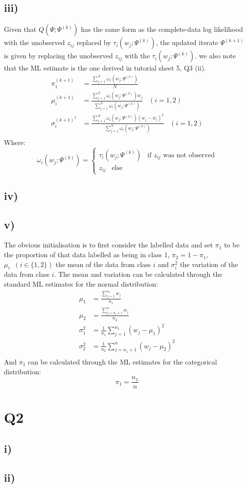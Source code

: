 \documentclass{article}
\begin{document}
\subsection*{iii)}
Given that $Q(\Psi;\Psi^{(k)})$ has the same form as the complete-data log likelihood with the unobserved $z_{ij}$ replaced by $\tau_i(w_j;\Psi^{(k)})$, the updated iterate $\Psi^{(k+1)}$ is given by replacing the unobserved $z_{ij}$ with the $\tau_i(w_j;\Psi^{(k)})$. we also note that the ML estimate is the one derived in tutorial sheet 5, Q3 (ii).
\begin{align*}
\pi_1^{(k+1)}&=\frac{\sum_{j=1}^{N}\omega_1(w_j;\Psi^{(k)})}{N}\\
\mu_i^{(k+1)}&=\frac{\sum_{j=1}^{N}\omega_i(w_j;\Psi^{(k)})w_j}{\sum_{j=1}^{N}\omega_i(w_j;\Psi^{(k)})}\;\;\;(i=1,2)\\
\sigma_i^{(k+1)^2}&=\frac{\sum_{j=1}^{N}\omega_i(w_j;\Psi^{(k)})(w_j-\bar{w_i})^2}{\sum_{j=1}^{N}\omega_i(w_j;\Psi^{(k)})}\;\;\;(i=1,2)\\
\end{align*}
Where:
$$\omega_i(w_j;\Psi^{(k)})=\begin{cases}
\tau_{i}(w_j;\Psi^{(k)})\;\;\;\text{if }z_{ij}\text{ was not observed}\\
z_{ij}\;\;\;\text{else}
\end{cases}$$
\subsection*{iv)}
 
\subsection*{v)}
The obvious initialisation is to first consider the labelled data and set $\pi_1$ to be the proportion of that data labelled as being in class 1, $\pi_2=1-\pi_1$, $\mu_i\;\;(i\in\{1,2\})$ the mean of the data from class $i$ and $\sigma_i^2$ the variation of the data from class $i$. The mean and variation can be calculated through the standard ML estimates for the normal distribution:
\begin{align*}
\mu_1&=\frac{\sum_{j=1}^{n_1}w_j}{n_1}\\
\mu_2&=\frac{\sum_{j=n_1+1}^{n}w_j}{n_2}\\
\sigma_1^2&=\frac{1}{n_1}\sum_{j=1}^{n_1}(w_j-\mu_1)^2\\
\sigma_2^2&=\frac{1}{n_2}\sum_{j=n_1+1}^{n}(w_j-\mu_2)^2\\
\end{align*}
And $\pi_1$ can be calculated through the ML estimates for the categorical distribution:
$$\pi_1=\frac{n_1}{n}$$
\section*{Q2}
\subsection*{i)}
\subsection*{ii)}
\end{document}

